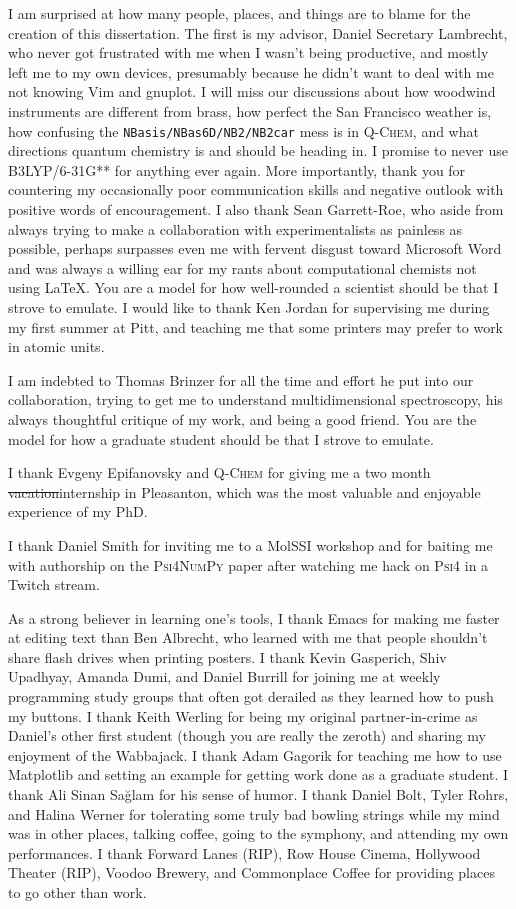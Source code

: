 \documentclass[%
  class = article,%
  crop = false,%
  float = true,%
  multi = true,%
  preview = false,%
]{standalone}
\begin{document}
I am surprised at how many people, places, and things are to blame for the creation of this dissertation. The first is my advisor, Daniel Secretary Lambrecht, who never got frustrated with me when I wasn't being productive, and mostly left me to my own devices, presumably because he didn't want to deal with me not knowing Vim and gnuplot. I will miss our discussions about how woodwind instruments are different from brass, how perfect the San Francisco weather is, how confusing the \texttt{NBasis/NBas6D/NB2/NB2car} mess is in \textsc{Q-Chem}, and what directions quantum chemistry is and should be heading in. I promise to never use B3LYP/6-31G** for anything ever again. More importantly, thank you for countering my occasionally poor communication skills and negative outlook with positive words of encouragement. I also thank Sean Garrett-Roe, who aside from always trying to make a collaboration with experimentalists as painless as possible, perhaps surpasses even me with fervent disgust toward Microsoft Word and was always a willing ear for my rants about computational chemists not using \LaTeX{}. You are a model for how well-rounded a scientist should be that I strove to emulate. I would like to thank Ken Jordan for supervising me during my first summer at Pitt, and teaching me that some printers may prefer to work in atomic units.

I am indebted to Thomas Brinzer for all the time and effort he put into our collaboration, trying to get me to understand multidimensional spectroscopy, his always thoughtful critique of my work, and being a good friend. You are the model for how a graduate student should be that I strove to emulate.

I thank Evgeny Epifanovsky and \textsc{Q-Chem} for giving me a two month \st{vacation}internship in Pleasanton, which was the most valuable and enjoyable experience of my PhD.

I thank Daniel Smith for inviting me to a MolSSI workshop and for baiting me with authorship on the \textsc{Psi4NumPy} paper after watching me hack on \textsc{Psi4} in a Twitch stream.

As a strong believer in learning one's tools, I thank Emacs for making me faster at editing text than Ben Albrecht, who learned with me that people shouldn't share flash drives when printing posters. I thank Kevin Gasperich, Shiv Upadhyay, Amanda Dumi, and Daniel Burrill for joining me at weekly programming study groups that often got derailed as they learned how to push my buttons. I thank Keith Werling for being my original partner-in-crime as Daniel's other first student (though you are really the zeroth) and sharing my enjoyment of the Wabbajack. I thank Adam Gagorik for teaching me how to use Matplotlib and setting an example for getting work done as a graduate student. I thank Ali Sinan Sa{\u{g}}lam for his sense of humor. I thank Daniel Bolt, Tyler Rohrs, and Halina Werner for tolerating some truly bad bowling strings while my mind was in other places, talking coffee, going to the symphony, and attending my own performances. I thank Forward Lanes (RIP), Row House Cinema, Hollywood Theater (RIP), Voodoo Brewery, and Commonplace Coffee for providing places to go other than work.
\end{document}
